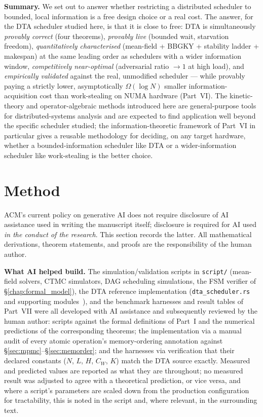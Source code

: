 \documentclass[11pt,a4paper]{report}
\newcommand{\dtact}{\textsc{DTA}}
\begin{document}
\bigskip
\noindent\textbf{Summary.}
We set out to answer whether restricting a distributed scheduler to
bounded, local information is a free design choice or a real cost. The
answer, for the DTA scheduler studied here, is that it is close to free:
DTA is simultaneously \emph{provably correct} (four theorems), \emph{provably
live} (bounded wait, starvation freedom), \emph{quantitatively
characterised} (mean-field + BBGKY + stability ladder + makespan) at the
same leading order as schedulers with a wider information window,
\emph{competitively near-optimal} (adversarial ratio $\to 1$ at high load),
and \emph{empirically validated} against the real, unmodified scheduler
--- while
provably paying a strictly lower, asymptotically $\Omega(\log N)$ smaller
information-acquisition cost than work-stealing on NUMA hardware
(Part~VI). The kinetic-theory and operator-algebraic methods introduced
here are general-purpose tools for distributed-systems analysis and are
expected to find application well beyond the specific scheduler studied;
the information-theoretic framework of Part~VI in particular gives a
reusable methodology for deciding, on any target hardware, whether a
bounded-information scheduler like DTA or a wider-information scheduler
like work-stealing is the better choice.

\section{Method}
\label{sec:ai-method}

ACM's current policy on generative AI does not require disclosure of AI
assistance used in writing the manuscript itself; disclosure is required
for AI used \emph{in the conduct of the research}. This section records
the latter. All mathematical derivations, theorem statements, and
proofs are the responsibility of the human author.

\medskip
\noindent\textbf{What AI helped build.}
The simulation/validation scripts in \texttt{script/} (mean-field
solvers, CTMC simulators, DAG scheduling simulations, the FSM verifier
of \S\ref{chap:formal_model}), the \dtact{} reference implementation
(\texttt{dta\_scheduler.rs} and supporting modules~\cite{dtact}), and
the benchmark harnesses and result tables of Part~VII were all
developed with AI assistance and subsequently reviewed by the human
author: scripts against the formal definitions of Part~I and the
numerical predictions of the corresponding theorems; the
implementation via a manual audit of every atomic operation's
memory-ordering annotation against
\S\ref{sec:mpmc}--\S\ref{sec:memorder}; and the harnesses via
verification that their declared constants ($N$, $L$, $H$, $C_W$, $K$)
match the \dtact{} source exactly. Measured and predicted values are
reported as what they are throughout; no measured result was adjusted
to agree with a theoretical prediction, or vice versa, and where a
script's parameters are scaled down from the production configuration
for tractability, this is noted in the script and, where relevant, in
the surrounding text.
\end{document}
